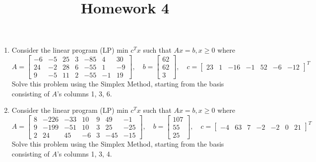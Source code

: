 \documentclass{article}
\begin{document}
\title{Homework 4}
\maketitle
\thispagestyle{fancy}

\begin{enumerate}[1:]
	\item Consider the linear program (LP) min $c^Tx$ such that $Ax=b, x\ge0$ where \[A=\begin{bmatrix}
				-6 & -5 & 25 & 3 & -85 & 4 & 30 \\
				24 & -2 & 28 & 6 & -55 & 1 & -9 \\
				9 & -5 & 11 & 2 & -55 & -1 & 19
			\end{bmatrix}, \quad b=\begin{bmatrix}
				62 \\ 62 \\ 3
			\end{bmatrix}, \quad c= \begin{bmatrix}
				23 & 1 & -16 & -1 & 52 & -6 & -12
		\end{bmatrix}^T\] Solve this problem using the Simplex Method, starting from the basis consisting of $A$'s columns 1, 3, 6.
		

	\item Consider the linear program (LP) min $c^Tx$ such that $Ax=b, x\ge 0$ where \[A=\begin{bmatrix}
				8 & -226 & -33 & 10 & 9 & 49 & -1 \\
				9 & -199 & -51 & 10 & 3 & 25 & -25 \\
				2 & 24 & 45 & -6 & 3 & -45 & -15
			\end{bmatrix}, \quad b=\begin{bmatrix}
				107 \\ 55 \\ 25
			\end{bmatrix}, \quad c=\begin{bmatrix}
				-4 & 63 & 7 & -2 & -2 & 0 & 21
		\end{bmatrix}^T\] Solve this problem using the Simplex Method, starting from the basis consisting of $A$'s columns 1, 3, 4.
		


\end{enumerate}
\end{document}
